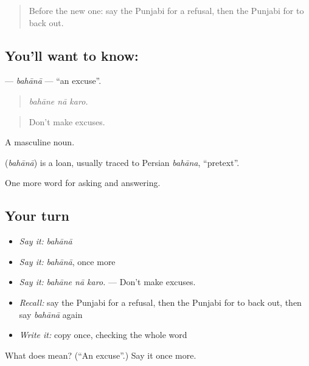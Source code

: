 \begin{quote}
Before the new one: say the Punjabi for a refusal, then the Punjabi for to back out.
\end{quote}

\subsection*{You'll want to know: }
\textbf{} — \emph{bahānā} — \textquotedblleft{}an excuse\textquotedblright{}.

\begin{quote}
  
\end{quote}

\begin{quote}
\emph{bahāne nā karo.}
\end{quote}

\begin{quote}
Don't make excuses.
\end{quote}

A masculine noun.

\begin{cousinweb}
\textbf{} (\emph{bahānā}) is a loan, usually traced to Persian \emph{bahāna}, \textquotedblleft{}pretext\textquotedblright{}.
\end{cousinweb}

\begin{grammarlens}[title={What you've built}]
One more word for asking and answering.
\end{grammarlens}

\subsection*{Your turn}
\begin{itemize}
\raggedright
  \item \emph{Say it:} \emph{bahānā}
  \item \emph{Say it:} \emph{bahānā}, once more
  \item \emph{Say it:} \emph{bahāne nā karo.} — Don't make excuses.
  \item \emph{Recall:} say the Punjabi for a refusal, then the Punjabi for to back out, then say \emph{bahānā} again
  \item \emph{Write it:} copy \textbf{} once, checking the whole word
\end{itemize}

\begin{tcolorbox}[breakable,colback=teal!4,colframe=teal!35!black,title={Before you move on}]
What does  mean? (\textquotedblleft{}An excuse\textquotedblright{}.) Say it once more.
\end{tcolorbox}
